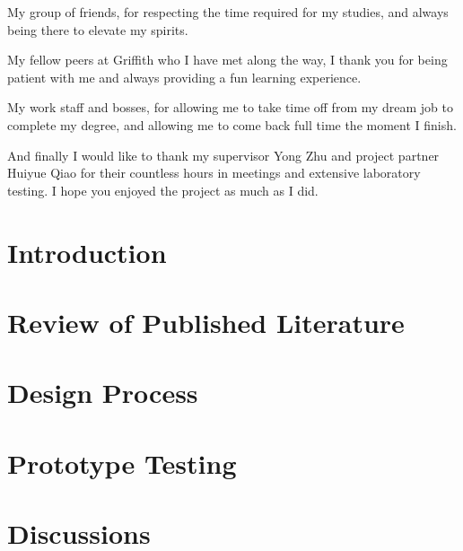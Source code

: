 \documentclass[12pt]{report} %
\begin{document}
My group of friends, for respecting the time required for my studies, and always being there to elevate my spirits. 

My fellow peers at Griffith who I have met along the way, I thank you for being patient with me and always providing a fun learning experience. 

My work staff and bosses, for allowing me to take time off from my dream job to complete my degree, and allowing me to come back full time the moment I finish. 

And finally I would like to thank my supervisor Yong Zhu and project partner Huiyue Qiao for their countless hours in meetings and extensive laboratory testing. I hope you enjoyed the project as much as I did. 
	\vfill

	


\tableofcontents
\thispagestyle{fancy}


\listoffigures
\thispagestyle{fancy}


\listoftables
\thispagestyle{fancy}


\clearpage
{} %
\pagestyle{fancy}
\chapter{Introduction}



\newpage
\chapter{Review of Published Literature}

\chapter{Design Process}

\chapter{Prototype Testing}

\chapter{Discussions}

\end{document}

